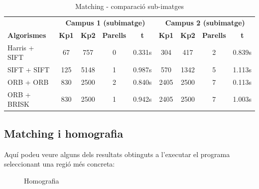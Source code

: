 		\begin{table}[H]
			\begin{center}
				\begin{tabular}{l | c c c c | c c c c}
					& \multicolumn{4}{c|}{\textbf{Campus 1 (subimatge)}} & \multicolumn{4}{c}{\textbf{Campus 2 (subimatge)}} \\
					\textbf{Algorismes} & \textbf{Kp1} & \textbf{Kp2} & \textbf{Parells} & \textbf{t} & \textbf{Kp1} & \textbf{Kp2} & \textbf{Parells} & \textbf{t} \\ \hline
					Harris + SIFT & 67 & 757 & 0 & 0.331s & 304 & 417 & 2 & 0.839s \\
					SIFT + SIFT & 125 & 5148 & 1 & 0.987s & 570 & 1342 & 5 & 1.113s \\
					ORB + ORB & 830 & 2500 & 2 & 0.840s & 2405 & 2500 & 7 & 0.113s \\
					ORB + BRISK & 830 & 2500 & 1 & 0.942s & 2405 & 2500 & 7 & 1.003s \\
				\end{tabular}
			\end{center}
			\caption{Matching - comparació sub-imatges}
		\end{table}
		\noindent

\newpage
	\subsection{Matching i homografia}
		Aquí podeu veure alguns dels resultats obtinguts a l'executar el programa seleccionant una regió més concreta:
		\begin{figure}[!htb]
		\end{figure}

		\begin{figure}[!htb]
			\caption{Homografia}
		\end{figure}
